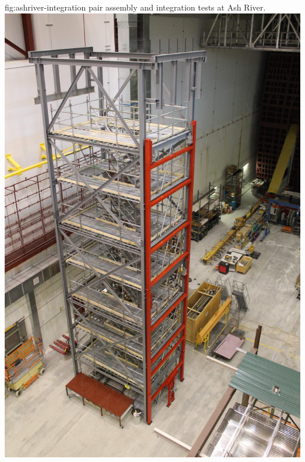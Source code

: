 \begin{dunefigure}{fig:ashriver-integration}
{ pair assembly and integration tests at Ash River.}
\includegraphics[height=0.5\textheight]{graphics/sp-apa-ash-river-ladder.jpg} \quad

\end{dunefigure}
